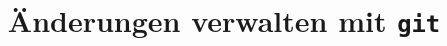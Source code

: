 

\title[\texttt{git}]{Änderungen verwalten mit \texttt{git}}



{
  \begin{frame}
    \titlepage
  \end{frame}
}




